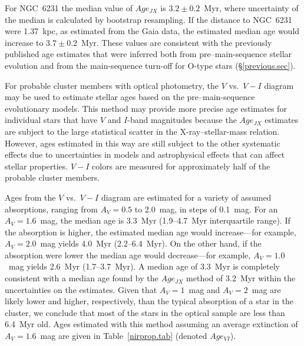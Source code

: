 \documentclass[twocolumn,tighten]{aastex61}
\begin{document}
For NGC~6231 the median value of $Age_{JX}$ is $3.2\pm0.2$~Myr, where uncertainty of the median is calculated by bootstrap resampling. If the distance to NGC~6231 were 1.37~kpc, as estimated from the Gaia data, the estimated median age would increase to $3.7\pm0.2$~Myr. These values are consistent with the previously published age estimates that were inferred both from pre--main-sequence stellar evolution and from the main-sequence turn-off for O-type stars (\S\ref{previous.sec}). 

For probable cluster members with optical photometry, the $V$ vs.\ $V-I$ diagram may be used to estimate stellar ages based on the \citeauthor{2000A&A...358..593S} pre--main-sequence evolutionary models. This method may provide more precise age estimates for individual stars that have $V$ and $I$-band magnitudes because the $Age_{JX}$ estimates are subject to the large statistical scatter in the X-ray--stellar-mass relation. However, ages estimated in this way are still subject to the other systematic effects due to uncertainties in models and astrophysical effects that can affect stellar properties. $V-I$ colors are measured for approximately half of the probable cluster members. 

Ages from the $V$ vs.\ $V-I$ diagram are estimated for a variety of assumed absorptions, ranging from $A_V=0.5$ to 2.0~mag, in steps of 0.1~mag. For an $A_V=1.6$~mag, the median age is 3.3~Myr (1.9--4.7~Myr interquartile range). If the absorption is higher, the estimated median age would increase---for example, $A_V=2.0$~mag yields 4.0~Myr (2.2--6.4~Myr). On the other hand, if the absorption were lower the median age would decrease---for example, $A_V=1.0$~mag yields 2.6~Myr (1.7--3.7~Myr). A median age of 3.3~Myr is completely consistent with a median age found by the $Age_{JX}$ method of 3.2~Myr within the uncertainties on the estimates. Given that $A_V=1$~mag and $A_V=2$~mag are likely lower and higher, respectively, than the typical absorption of a star in the cluster, we conclude that most of the stars in the optical sample are less than 6.4~Myr old. Ages estimated with this method assuming an average extinction of $A_V=1.6$~mag are given in Table~\ref{nirprop.tab} (denoted $Age_{VI}$).
\end{document}
